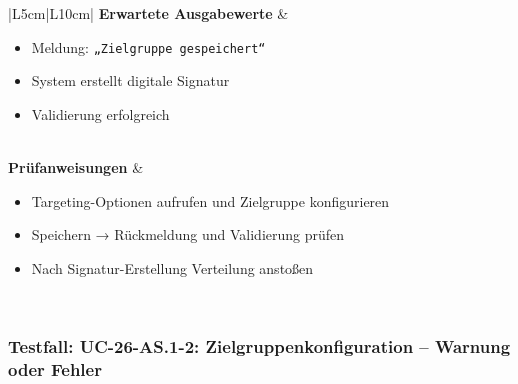 \documentclass[a4paper,12pt]{article}
\begin{document}
\begin{longtable}{|L{5cm}|L{10cm}|}
\hline
\textbf{Erwartete Ausgabewerte} &
\begin{minipage}[t]{\linewidth}
\vspace{0.5em}
\begin{itemize}[leftmargin=*]
  \item Meldung: \texttt{„Zielgruppe gespeichert“}
  \item System erstellt digitale Signatur
  \item Validierung erfolgreich
\end{itemize}
\vspace{0.5em}
\end{minipage} \\
\hline
\textbf{Prüfanweisungen} &
\begin{minipage}[t]{\linewidth}
\vspace{0.5em}
\begin{itemize}[leftmargin=*]
  \item Targeting-Optionen aufrufen und Zielgruppe konfigurieren
  \item Speichern → Rückmeldung und Validierung prüfen
  \item Nach Signatur-Erstellung Verteilung anstoßen
\end{itemize}
\vspace{0.5em}
\end{minipage} \\
\hline
\end{longtable}


\subsubsection{Testfall: UC-26-AS.1-2: Zielgruppenkonfiguration – Warnung oder Fehler}
\end{document}
